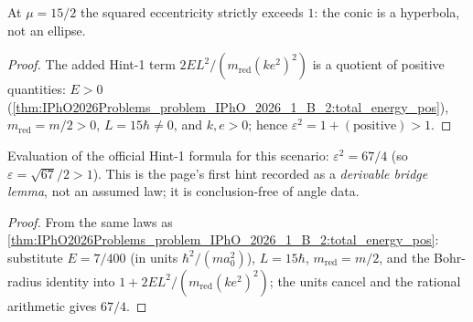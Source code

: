 \begin{lemma}
\label{lem:IPhO2026Problems_problem_IPhO_2026_1_B_2:eccentricity_gt_one}
At $\mu = 15/2$ the squared eccentricity strictly exceeds $1$: the conic is
a hyperbola, not an ellipse.
\end{lemma}
\begin{proof}
The added Hint-1 term $2 E L^2/(m_{\mathrm{red}} (k e^2)^2)$ is a quotient
of positive quantities: $E > 0$
(\cref{thm:IPhO2026Problems_problem_IPhO_2026_1_B_2:total_energy_pos}),
$m_{\mathrm{red}} = m/2 > 0$, $L = 15\hbar \neq 0$, and $k, e > 0$; hence
$\varepsilon^2 = 1 + (\text{positive}) > 1$.
\end{proof}

\begin{theorem}
\label{thm:IPhO2026Problems_problem_IPhO_2026_1_B_2:eccentricity_sq_eq}
Evaluation of the official Hint-1 formula for this scenario:
$\varepsilon^2 = 67/4$ (so $\varepsilon = \sqrt{67}/2 > 1$).  This is the
page's first hint recorded as a \emph{derivable bridge lemma}, not an
assumed law; it is conclusion-free of angle data.
\end{theorem}
\begin{proof}
From the same laws as
\cref{thm:IPhO2026Problems_problem_IPhO_2026_1_B_2:total_energy_pos}:
substitute $E = 7/400$ (in units $\hbar^2/(m a_0^2)$), $L = 15\hbar$,
$m_{\mathrm{red}} = m/2$, and the Bohr-radius identity into
$1 + 2 E L^2/(m_{\mathrm{red}}(k e^2)^2)$; the units cancel and the
rational arithmetic gives $67/4$.
\end{proof}

